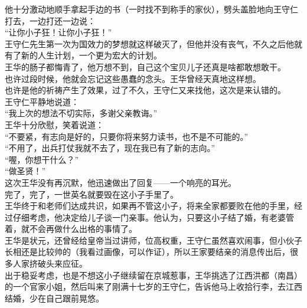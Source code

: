 \begin{multicols}{\theparacolNo}
他十分激动地顺手拿起手边的书（一时找不到称手的家伙），劈头盖脸地向王守仁打去，一边打还一边说：\\

“让你小子狂！让你小子狂！”\\

王守仁先生第一次为国效力的梦想就这样破灭了，但他并没有丧气，不久之后他就有了新的人生计划，一个更为宏大的计划。\\

王华的肠子都悔青了，他万想不到，自己这个宝贝儿子还真是啥都敢想敢干。\\

也许过段时候，他就会忘记这些愚蠢的念头。王华曾经天真地这样想。\\

也许是他的祈祷产生了效果，过了不久，王守仁又来找他，这次是来认错的。\\

王守仁平静地说道：\\

“我上次的想法不切实际，多谢父亲教诲。”\\

王华十分欣慰，笑着说道：\\

“不要紧，有志向是好的，只要你将来努力读书，也不是不可能的。”\\

“不用了，出兵打仗我就不去了，现在我已有了新的志向。”\\

“喔，你想干什么？”\\

“做圣贤！”\\

这次王华没有再沉默，他迅速做出了回复——一个响亮的耳光。\\

完了，完了，一世英名就要毁在这小子手里了。\\

王华终于和老师们达成共识，如果再不管这小子，将来全家都要败在他的手里，经过仔细考虑，他决定给儿子谈一门亲事。他认为，只要这小子结了婚，有老婆管着，就不会再做什么出格的事情了。\\

王华是状元，还曾经给皇帝当过讲师，位高权重，王守仁虽然喜欢闹事，但小伙子长相还是比较帅的（我看过画像，可以作证），所以王家要结亲的消息传出后，很多人家挤破头来应征。\\

出于稳妥考虑，也是不想这小子继续留在京城惹事，王华挑选了江西洪都（南昌）的一个官家小姐，然后叫来了刚满十七岁的王守仁，告诉他马上收拾行李，去江西结婚，少在自己跟前晃悠。\\


\end{multicols}

